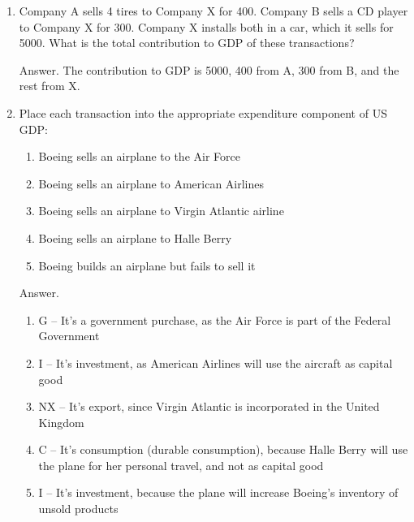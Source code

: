 \documentclass[12pt,letterpaper]{article}
\begin{document}
\begin{enumerate}

\item Company A sells 4 tires to Company X for 400.
Company B sells a CD player to Company X for 300.
Company X installs both in a car, which it sells for 5000.
What is the total contribution to GDP of these transactions?

Answer.  The contribution to GDP is 5000, 400 from A, 300 from B,
and the rest from X.

\item Place each transaction into the appropriate expenditure component of US GDP:%
%
\begin{enumerate}
\item Boeing sells an airplane to the Air Force%
\item Boeing sells an airplane to American Airlines%
\item Boeing sells an airplane to Virgin Atlantic airline%
\item Boeing sells an airplane to Halle Berry%
\item Boeing builds an airplane but fails to sell it%
\end{enumerate}
%
Answer.
%
\begin{enumerate}
\item G -- It's a government purchase, as the Air Force is part of the Federal Government%
\item I -- It's investment, as American Airlines will use the aircraft as capital good%
\item NX -- It's export, since Virgin Atlantic is incorporated in the United Kingdom%
\item C -- It's consumption (durable consumption), because Halle Berry will use the plane for her personal travel, and not as capital good%
\item I -- It's investment, because the plane will increase Boeing's inventory of unsold products%
\end{enumerate}



\end{enumerate}
\end{document}

